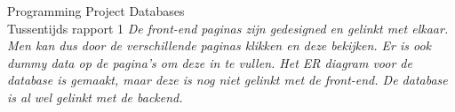 \documentclass[a4paper]{article}
\newcounter{team}
\begin{document}
\begin{Minutes}{Programming Project Databases \\ Tussentijds rapport 1 }
			\emph{De front-end paginas zijn gedesigned en gelinkt met elkaar. Men kan dus door de verschillende paginas klikken en deze bekijken. Er is ook dummy data op de pagina's om deze in te vullen. Het ER diagram voor de database is gemaakt, maar deze is nog niet gelinkt met de front-end. De database is al wel gelinkt met de backend.}


        
		
		
	\end{Minutes}	
\end{document}
